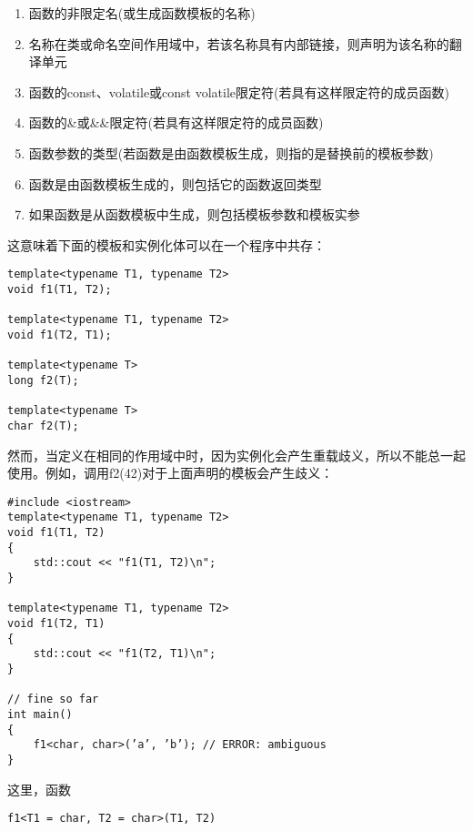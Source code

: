 \begin{enumerate}
\item 
函数的非限定名(或生成函数模板的名称)

\item 
名称在类或命名空间作用域中，若该名称具有内部链接，则声明为该名称的翻译单元

\item 
函数的const、volatile或const volatile限定符(若具有这样限定符的成员函数)

\item 
函数的\&或\&\&限定符(若具有这样限定符的成员函数)

\item 
函数参数的类型(若函数是由函数模板生成，则指的是替换前的模板参数)

\item 
函数是由函数模板生成的，则包括它的函数返回类型

\item 
如果函数是从函数模板中生成，则包括模板参数和模板实参
\end{enumerate}

这意味着下面的模板和实例化体可以在一个程序中共存：

\begin{lstlisting}[style=styleCXX]
template<typename T1, typename T2>
void f1(T1, T2);

template<typename T1, typename T2>
void f1(T2, T1);

template<typename T>
long f2(T);

template<typename T>
char f2(T);
\end{lstlisting}

然而，当定义在相同的作用域中时，因为实例化会产生重载歧义，所以不能总一起使用。例如，调用f2(42)对于上面声明的模板会产生歧义：

\begin{lstlisting}[style=styleCXX]
#include <iostream>
template<typename T1, typename T2>
void f1(T1, T2)
{
	std::cout << "f1(T1, T2)\n";
}

template<typename T1, typename T2>
void f1(T2, T1)
{
	std::cout << "f1(T2, T1)\n";
}

// fine so far
int main()
{
	f1<char, char>(’a’, ’b’); // ERROR: ambiguous
}
\end{lstlisting}

这里，函数

\begin{lstlisting}[style=styleCXX]
f1<T1 = char, T2 = char>(T1, T2)
\end{lstlisting}

